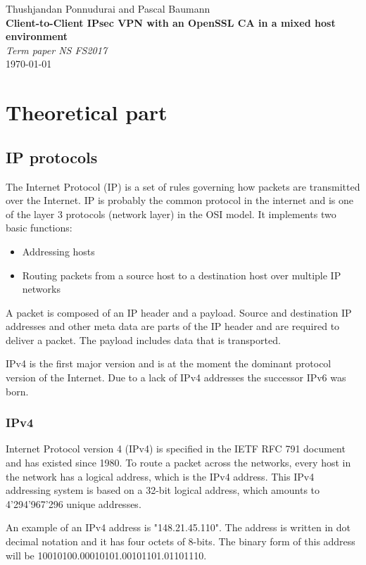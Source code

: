 \documentclass[a4paper]{report}
\newcommand*{\titleAP}{\begingroup %
	\centering
	\vspace*{\baselineskip} %
	
	{\Large Thushjandan Ponnudurai} and {\Large Pascal Baumann}\\[0.167\textheight] %
	
	{\Huge\bfseries Client-to-Client IPsec VPN with an OpenSSL CA in a mixed host environment}\\[\baselineskip]
	
	{\Large \textit{Term paper NS FS2017}}\\
	\today
	
	\vspace*{3\baselineskip} %
	\endgroup}
\begin{document}
\titleAP

\newpage

\begin{abstract}
	\blindtext
\end{abstract}

\tableofcontents

\newpage

\chapter{Theoretical part}
\label{ch:Theory}

\section{IP protocols}
\label{sec:IPprot}
The Internet Protocol (IP) is a set of rules governing how packets are transmitted over the Internet. IP is probably the common protocol in the internet and is one of the layer 3 protocols (network layer) in the OSI model. It implements two basic functions:
\begin{itemize}
	\item Addressing hosts
	\item Routing packets from a source host to a destination host over multiple IP networks
\end{itemize}
A packet is composed of an IP header and a payload. Source and destination IP addresses and other meta data are parts of the IP header and are required to deliver a packet. The payload includes data that is transported.

IPv4 is the first major version and is at the moment the dominant protocol version of the Internet. Due to a lack of IPv4 addresses the successor IPv6 was born. \parencite{NadeemUnuth2016}

\subsection{IPv4}
\label{ssec:IPv4}
Internet Protocol version 4 (IPv4) is specified in the IETF RFC 791 document \parencite{Postel} and has existed since 1980. To route a packet across the networks, every host in the network has a logical address, which is the IPv4 address. This IPv4 addressing system is based on a 32-bit logical address, which amounts to 4'294'967'296 unique addresses.

An example of an IPv4 address is "148.21.45.110". The address is written in dot decimal notation and it has four octets of 8-bits. The binary form of this address will be 10010100.00010101.00101101.01101110. \parencite{Babatunde2014}
\end{document}
